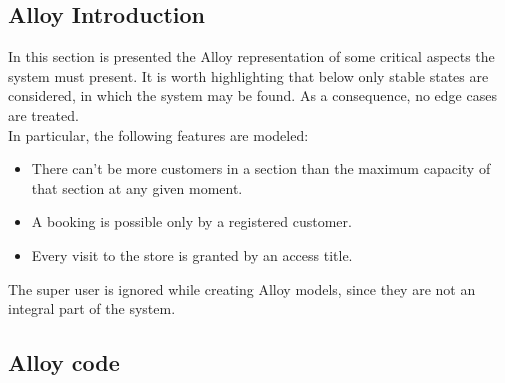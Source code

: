 \subsection{Alloy Introduction}

In this section is presented the Alloy representation of some critical aspects the system must present.
It is worth highlighting that below only stable states are considered, in which the system may be found.
As a consequence, no edge cases are treated. \\
In particular, the following features are modeled:
\begin{itemize}
    \item There can't be more customers in a section than the maximum capacity of that section at any given moment.
    \item A booking is possible only by a registered customer.
    \item Every visit to the store is granted by an access title.
\end{itemize}
The super user is ignored while creating Alloy models, since they are not an integral part of the system.

\subsection{Alloy code}



